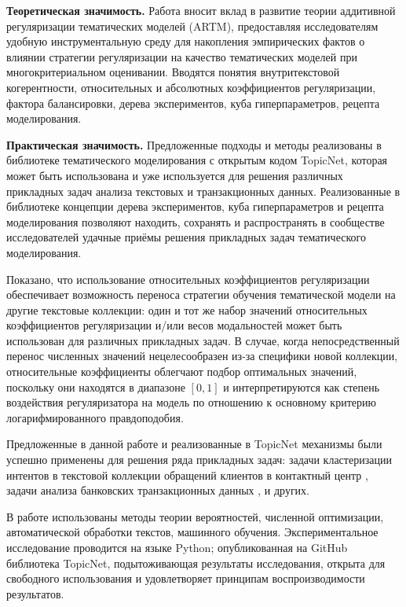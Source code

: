 \textbf{Теоретическая значимость.} 
Работа вносит вклад в развитие теории аддитивной регуляризации тематических моделей (ARTM), предоставляя исследователям удобную инструментальную среду для накопления эмпирических фактов о влиянии стратегии регуляризации на качество тематических моделей при многокритериальном оценивании. Вводятся понятия внутритекстовой когерентности, относительных и абсолютных коэффициентов регуляризации, фактора балансировки, дерева экспериментов, куба гиперпараметров, рецепта моделирования.

\textbf{Практическая значимость.} 
Предложенные подходы и методы реализованы в библиотеке тематического моделирования с открытым кодом TopicNet, которая может быть использована и уже используется для решения различных прикладных задач анализа текстовых и транзакционных данных. Реализованные в библиотеке концепции дерева экспериментов, куба гиперпараметров и рецепта моделирования позволяют находить, сохранять и распространять в сообществе исследователей удачные приёмы решения прикладных задач тематического моделирования.

Показано, что использование относительных коэффициентов регуляризации обеспечивает возможность переноса стратегии обучения тематической модели на другие текстовые коллекции: один и тот же набор значений относительных коэффициентов регуляризации и/или весов модальностей может быть использован для различных прикладных задач. В случае, когда непосредственный перенос численных значений нецелесообразен из-за специфики новой коллекции, относительные коэффициенты облегчают подбор оптимальных значений, поскольку они находятся в диапазоне $[0, 1]$ и интерпретируются как степень воздействия регуляризатора на модель по отношению к основному критерию логарифмированного правдоподобия.

Предложенные в данной работе и реализованные в TopicNet механизмы были успешно применены для решения ряда прикладных задач: 
задачи кластеризации интентов в текстовой коллекции обращений клиентов в контактный центр \cite{popov_hier}, 
задачи анализа банковских транзакционных данных \cite{egorov2019topic}, и других.

{\methods} В работе использованы методы теории вероятностей, численной оптимизации, автоматической обработки текстов, машинного обучения. Экспериментальное исследование проводится на языке Python; опубликованная на GitHub библиотека TopicNet, подытоживающая результаты исследования, открыта для свободного использования и удовлетворяет принципам воспроизводимости результатов.

